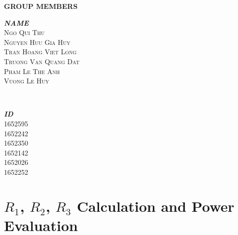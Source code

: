 \documentclass[12pt]{extarticle}
\newcommand{\<}{\langle}
\renewcommand{\>}{\rangle}
\theoremstyle{definition}
\begin{document}
\begin{center}
{\huge\bfseries GROUP MEMBERS}\\[1cm]

\end{center}
	\begin{minipage}{0.5\textwidth}
		\begin{flushleft}
			\large
			\textit{{\huge\bfseries NAME}\\[0.5cm]}
			 \textsc{{Ngo Qui Thu}\\[0.2cm]}
			 \textsc{{Nguyen Huu Gia Huy}\\[0.2cm]}
			 \textsc{{Tran Hoang Viet Long}\\[0.2cm]}
			 \textsc{{Truong Van Quang Dat}\\[0.2cm]}
			 \textsc{{Pham Le The Anh}\\[0.2cm]}
			 \textsc{{Vuong Le Huy}\\[0.2cm]}
		\end{flushleft}
	\end{minipage}
	~
	\begin{minipage}{0.5\textwidth}
		\begin{flushright}
			\large
			\textit{{\huge\bfseries ID}\\[0.5cm]}
			 \textsc{{1652595}\\[0.2cm]}
			 \textsc{{1652242}\\[0.2cm]}
			 \textsc{{1652350}\\[0.2cm]}
			 \textsc{{1652142}\\[0.2cm]}
			 \textsc{{1652026}\\[0.2cm]}
			 \textsc{{1652252}\\[0.2cm]}
		\end{flushright}
	\end{minipage}
\clearpage


{\large\tableofcontents}


\maketitle

\section{$R_1$, $R_2$, $R_3$ Calculation and Power Evaluation}
\end{document}
